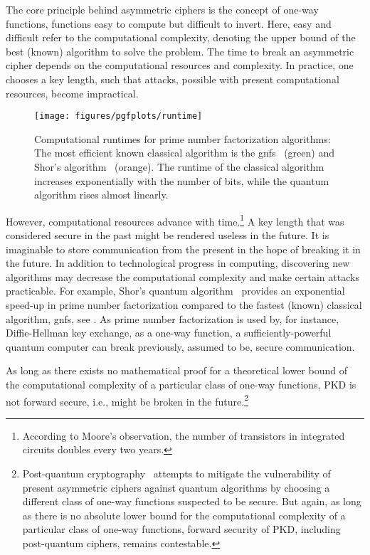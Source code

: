 The core principle behind asymmetric ciphers is the concept of one-way functions, functions easy to compute but difficult to invert.
Here, easy and difficult refer to the computational complexity, denoting the upper bound of the best (known) algorithm to solve the problem.
The time to break an asymmetric cipher depends on the computational resources and complexity.
In practice, one chooses a key length, such that attacks, possible with present computational resources, become impractical.
\begin{figure}[htb]
	\centering
	\texttt{[image: figures/pgfplots/runtime]}
	\caption{Computational runtimes for prime number factorization algorithms: The most efficient known classical algorithm is the \gls{gnfs}~\cite{Lenstra1993} (green) and Shor's algorithm~\cite{Shor1994} (orange). The runtime of the classical algorithm increases exponentially with the number of bits, while the quantum algorithm rises almost linearly.}
	\label{fig:prime_number_factorization_runtime}
\end{figure}
However, computational resources advance with time.\footnote{According to Moore's observation, the number of transistors in integrated circuits doubles every two years.}
A key length that was considered secure in the past might be rendered useless in the future.
It is imaginable to store communication from the present in the hope of breaking it in the future.
In addition to technological progress in computing, discovering new algorithms may decrease the computational complexity and make certain attacks practicable.
For example, Shor's quantum algorithm~\cite{Shor1994} provides an exponential speed-up in prime number factorization compared to the fastest (known) classical algorithm, \gls{gnfs}, see .
As prime number factorization is used by, for instance, Diffie-Hellman key exchange, as a one-way function, a sufficiently-powerful quantum computer can break previously, assumed to be, secure communication.

As long as there exists no mathematical proof for a theoretical lower bound of the computational complexity of a particular class of one-way functions, PKD is not forward secure, i.e., might be broken in the future.\footnote{Post-quantum cryptography~\cite{Bernstein2017,Chen2016} attempts to mitigate the vulnerability of present asymmetric ciphers against quantum algorithms by choosing a different class of one-way functions suspected to be secure. But again, as long as there is no absolute lower bound for the computational complexity of a particular class of one-way functions, forward security of PKD, including post-quantum ciphers, remains contestable.}

